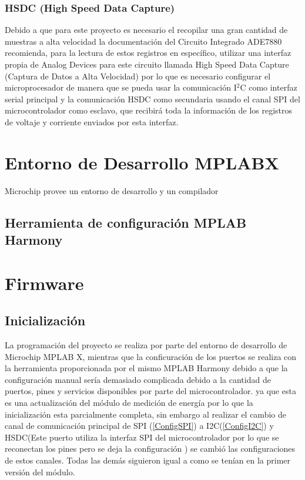 \documentclass[letterpaper,12pt,oneside]{book}
\begin{document}
			\subsubsection{HSDC (High Speed Data Capture)}
			Debido a que para este proyecto es necesario el recopilar una gran cantidad de muestras a alta velocidad la documentación del Circuito Integrado ADE7880 recomienda, para la lectura de estos registros en específico, utilizar una interfaz propia de Analog Devices para este circuito llamada High Speed Data Capture (Captura de Datos a Alta Velocidad) por lo que es necesario configurar el microprocesador de manera que se pueda usar la comunicación I$^2$C como interfaz serial principal y la comunicación HSDC como secundaria usando el canal SPI del microcontrolador como esclavo, que recibirá toda la información de los registros de voltaje y corriente enviados por esta interfaz.

		\section{Entorno de Desarrollo MPLABX}
		Microchip provee un entorno de desarrollo y un compilador 
			\subsection{Herramienta de configuración MPLAB Harmony}

		\section{Firmware}
			\subsection{Inicialización}
			La programación del proyecto se realiza por parte del entorno de desarrollo de Microchip MPLAB X, mientras que la conficuración de los puertos se realiza con la herramienta proporcionada por el mismo MPLAB Harmony debido a que la configuración manual sería demasiado complicada debido a la cantidad de puertos, pines y servicios disponibles por parte del microcontrolador. ya que esta es una actualización del módulo de medición de energía por lo que la inicialización esta parcialmente completa, sin embargo al realizar el cambio de canal de comunicación principal de SPI (\ref{ConfigSPI}) a I2C(\ref{ConfigI2C}) y HSDC(Este puerto utiliza la interfaz SPI del microcontrolador por lo que se reconectan los pines pero se deja la configuración ) se cambió las configuraciones de estos canales. Todas las demás siguieron igual a como se tenían en la primer versión del módulo.
\end{document}
